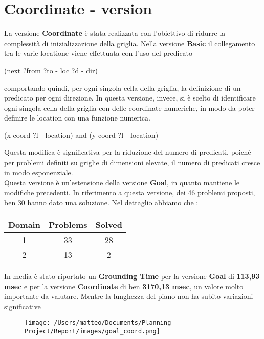 \documentclass{article}
\begin{document}
\section*{Coordinate - version}
La versione \textbf{Coordinate} è stata realizzata con l'obiettivo di ridurre la complessità di inizializzazione della griglia. Nella versione \textbf{Basic} il collegamento tra le varie locatione viene effettuata 
con l'uso del predicato 
\begin{center}
    (next ?from ?to - loc ?d - dir)
\end{center}
comportando quindi, per ogni singola cella della griglia, la definizione di un predicato per ogni direzione.
In questa versione, invece, si è scelto di identificare ogni singola cella della griglia con delle coordinate numeriche, in modo da poter definire le location con una funzione numerica. 
\begin{center}
    (x-coord ?l - location) \hspace{0.5cm} and \hspace{0.5cm} (y-coord ?l - location)
\end{center}
Questa modifica è significativa per la riduzione del numero di predicati,
poichè per problemi definiti su griglie di dimensioni elevate, il numero di predicati cresce in modo esponenziale.\\
Questa versione è un'estensione della versione \textbf{Goal}, in quanto mantiene le modifiche precedenti.
In riferimento a questa versione, dei 46 problemi proposti, ben 30 hanno dato una soluzione. Nel dettaglio abbiamo che :
\begin{table}[H]
    \centering
    \begin{tabular}{|c|c|c|}
        \hline
        \textbf{Domain} & \textbf{Problems} & \textbf{Solved}\\
        \hline
        1 & 33 & 28 \\
        \hline
        2 & 13 & 2\\
        \hline
    \end{tabular}
\end{table}
\noindent
In media è stato riportato un \textbf{Grounding Time} per la versione \textbf{Goal} di \textbf{113,93 msec} e per la versione \textbf{Coordinate} di ben \textbf{3170,13 msec}, un valore molto importante da valutare.
Mentre la lunghezza del piano non ha subito variazioni significative
\begin{figure}[H]
    \centering
    \texttt{[image: /Users/matteo/Documents/Planning-Project/Report/images/goal\_coord.png]}
    \label{fig:coord}
\end{figure}
\end{document}
